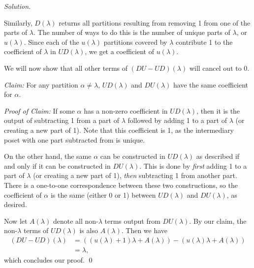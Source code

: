 \documentclass[11pt,letterpaper,dvipsnames]{article}
\newenvironment{solution}{\color{BlueViolet}\textit{Solution.}}{\color{black}}
\begin{document}
\begin{enumerate}
\begin{solution}
\begin{enumerate}
			Similarly, $D(\lambda)$ returns all partitions resulting from removing 1 from one of the parts of $\lambda$. The number of ways to do this is the number of unique parts of $\lambda$, or $u(\lambda)$. Since each of the $u(\lambda)$ partitions covered by $\lambda$ contribute 1 to the coefficient of $\lambda$ in $UD(\lambda)$, we get a coefficient of $u(\lambda)$.

			We will now show that all other terms of $(DU-UD)(\lambda)$ will cancel out to 0.

			\vspace{0.2cm}
			\textit{Claim:} For any partition $\alpha \neq \lambda$, $UD(\lambda)$ and $DU(\lambda)$ have the same coefficient for $\alpha$.

			\vspace{0.2cm}
			\textit{Proof of Claim:} If some $\alpha$ has a non-zero coefficient in $UD(\lambda)$, then it is the output of subtracting 1 from a part of $\lambda$ followed by adding 1 to a part of $\lambda$ (or creating a new part of 1). Note that this coefficient is 1, as the intermediary poset with one part subtracted from is unique.
			
			On the other hand, the same $\alpha$ can be constructed in $UD(\lambda)$ as described if and only if it can be constructed in $DU(\lambda)$. This is done by \textit{first} adding 1 to a part of $\lambda$ (or creating a new part of 1), \textit{then} subtracting 1 from another part. There is a one-to-one correspondence between these two constructions, so the coefficient of $\alpha$ is the same (either 0 or 1) between $UD(\lambda)$ and $DU(\lambda)$, as desired.

			\vspace{0.2cm}
			Now let $A(\lambda)$ denote all non-$\lambda$ terms output from $DU(\lambda)$. By our claim, the non-$\lambda$ terms of $UD(\lambda)$ is also $A(\lambda)$. Then we have
			\begin{align*}
				(DU-UD)(\lambda) &= ((u(\lambda)+1)\lambda + A(\lambda)) - (u(\lambda)\lambda + A(\lambda))\\
				&= \lambda,
			\end{align*}
			 which concludes our proof. \qed
			

\end{enumerate}
\end{solution}
\end{enumerate}
\end{document}
